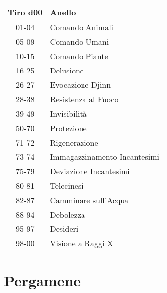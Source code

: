 \documentclass{article}
\begin{document}
\begin{multicols}{2}
\begin{tabular}{|c|l|}
\hline
\textbf{Tiro d00} & \textbf{Anello} \\
\hline
01-04 & Comando Animali \\
05-09 & Comando Umani \\
10-15 & Comando Piante \\
16-25 & Delusione \\
26-27 & Evocazione Djinn \\
28-38 & Resistenza al Fuoco \\
39-49 & Invisibilità \\
50-70 & Protezione \\
71-72 & Rigenerazione \\
73-74 & Immagazzinamento Incantesimi \\
75-79 & Deviazione Incantesimi \\
80-81 & Telecinesi \\
82-87 & Camminare sull'Acqua \\
88-94 & Debolezza \\
95-97 & Desideri \\
98-00 & Visione a Raggi X \\
\hline

\end{tabular}

\section{Pergamene}


\end{multicols}
\end{document}
